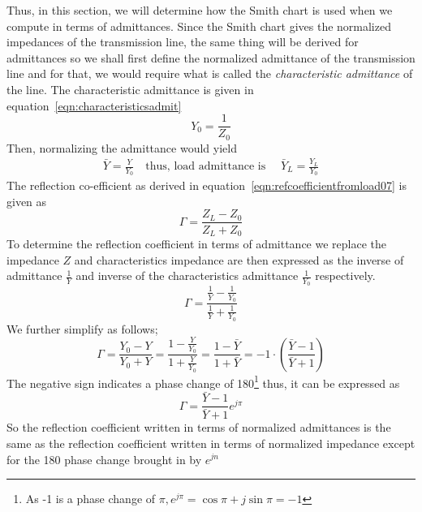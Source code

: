 Thus, in this section, we will determine how the Smith chart is used when we compute in terms of admittances. Since the Smith chart gives the normalized impedances of the transmission line, the same thing will be derived for admittances so we shall first define the normalized admittance of the transmission line and for that, we would require what is called the \emph{characteristic admittance} of the line. The characteristic admittance  is given in equation~\eqref{eqn:characteristicsadmit}
\begin{equation}
Y_0 = \frac{1}{Z_0}\label{eqn:characteristicsadmit}
\end{equation}
Then, normalizing the admittance would yield
\begin{align*}
\bar{Y} = \frac{Y}{Y_0}\quad\text{thus, load admittance is }\quad\bar{Y}_L = \frac{Y_L}{Y_0}
\end{align*}
The reflection co-efficient as derived in equation~\eqref{eqn:refcoefficientfromload07} is given as
\begin{equation*}
\Gamma = \frac{Z_L - Z_0}{Z_L + Z_0} 
\end{equation*}
To determine the reflection coefficient in terms of admittance we replace the impedance $Z$ and characteristics impedance are then expressed as the inverse of admittance $\frac{1}{Y}$ and inverse of the characteristics admittance  $\frac{1}{Y_0}$ respectively.
\begin{equation*}
\Gamma = \frac{\frac{1}{Y} - \frac{1}{Y_0}}{\frac{1}{Y} + \frac{1}{Y_0}}
\end{equation*}
We further simplify as follows;
\begin{dmath*}
\Gamma = \frac{Y_0 - Y}{Y_0 + Y}
= \frac{1 - \frac{Y}{Y_0}}{1 + \frac{Y}{Y_0}}
= \frac{1 - \bar{Y}}{1 + \bar{Y}} = -1\cdot\left(\frac{\bar{Y} - 1}{\bar{Y} + 1}\right)
\end{dmath*}
The negative sign indicates a phase change of 180\textdegree\footnote{
As -1 is a phase change of $\pi, e^{j\pi} = \cos\pi + j\sin\pi = -1$
} thus, it can be expressed as
\begin{equation}
\Gamma = \frac{\bar{Y} - 1}{\bar{Y} + 1}e^{j\pi}
\end{equation}
So the reflection coefficient written in terms of normalized admittances  is the same as the reflection coefficient written in terms of normalized impedance except for the 180\textdegree\; phase change brought in by $e^{jn}$

